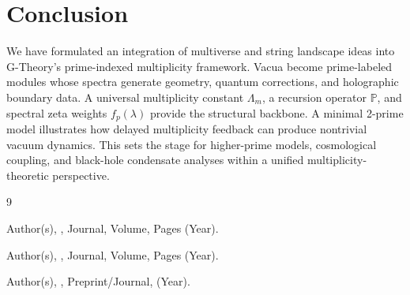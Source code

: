 \documentclass[11pt]{article}
\begin{document}
\section{Conclusion}

We have formulated an integration of multiverse and string landscape ideas into G-Theory's prime-indexed multiplicity framework.
Vacua become prime-labeled modules whose spectra generate geometry, quantum corrections, and holographic boundary data.
A universal multiplicity constant \(\Lambda_m\), a recursion operator \(\mathbb{P}\), and spectral zeta weights \(f_p(\lambda)\) provide the structural backbone.
A minimal 2-prime model illustrates how delayed multiplicity feedback can produce nontrivial vacuum dynamics.
This sets the stage for higher-prime models, cosmological coupling, and black-hole condensate analyses within a unified multiplicity-theoretic perspective.


\begin{thebibliography}{9}

Author(s),
,
\newblock Journal, Volume, Pages (Year).

Author(s),
,
\newblock Journal, Volume, Pages (Year).

Author(s),
,
\newblock Preprint/Journal, (Year).

\end{thebibliography}
\end{document}
